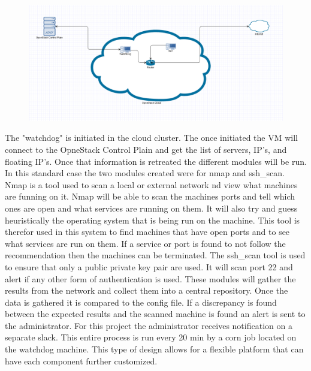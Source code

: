\documentclass[12pt]{article}
\begin{document}
\begin{figure}[H]
    \includegraphics[scale=.3]{./pic/flowchart.png}
\end{figure}

The "watchdog" is initiated in the cloud cluster. The once initiated the VM will connect to the OpneStack Control Plain and get the list of servers, IP's, and floating IP's. Once that information is retreated the different modules will be run. In this standard case the two modules created were for nmap and ssh\_scan. Nmap is a tool used to scan a local or external network nd view what machines are funning on it. Nmap will be able to scan the machines ports and tell which ones are open and what services are running on them. It will also try and guess heuristically the operating system that is being run on the machine. This tool is therefor used in this system to find machines that have open ports and to see what services are run on them. If a service or port is found to not follow the recommendation then the machines can be terminated. The ssh\_scan tool is used to ensure that only a public private key pair are used. It will scan port 22 and alert if any other form of authentication is used.
These modules will gather the results from the network and collect them into a central repository. Once the data is gathered it is compared to the config file.  If a discrepancy is found between the expected results and the scanned machine is found an alert is sent to the administrator. For this project the administrator receives notification on a separate slack. This entire process is run every 20 min by a corn job located on the watchdog machine. This type of design allows for a flexible platform that can have each component further customized.
\end{document}
